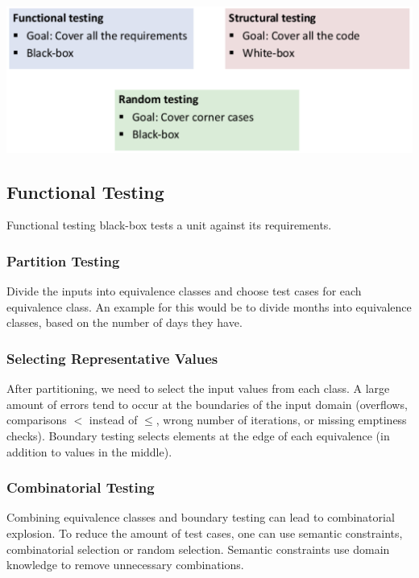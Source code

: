 \begin{center}
	\includegraphics[width=0.9\columnwidth]{assets/testing_strategies}
\end{center}


\subsection{Functional Testing}

Functional testing black-box tests a unit against its requirements.

\subsubsection{Partition Testing}

Divide the inputs into equivalence classes and choose test cases for each equivalence class. An example for this would be to divide months into equivalence classes, based on the number of days they have.

\subsubsection{Selecting Representative Values}

After partitioning, we need to select the input values from each class. A large amount of errors tend to occur at the boundaries of the input domain (overflows, comparisons $<$ instead of $\leq$, wrong number of iterations, or missing emptiness checks). Boundary testing selects elements at the edge of each equivalence (in addition to values in the middle).

\subsubsection{Combinatorial Testing}

Combining equivalence classes and boundary testing can lead to combinatorial explosion. To reduce the amount of test cases, one can use semantic constraints, combinatorial selection or random selection. Semantic constraints use domain knowledge to remove unnecessary combinations. \\

